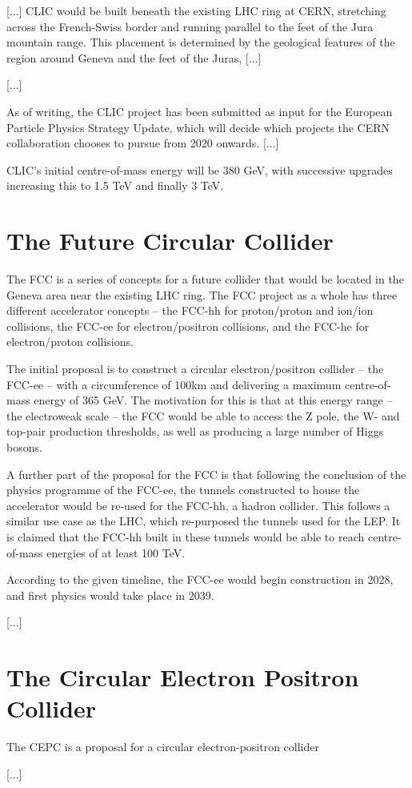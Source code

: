 [...] CLIC would be built beneath the existing LHC ring at CERN, stretching across the French-Swiss border and running parallel to the feet of the Jura mountain range. This placement is determined by the geological features of the region around Geneva and the feet of the Juras, [...]


[...]

As of writing, the CLIC project has been submitted as input for the European Particle Physics Strategy Update, which will decide which projects the CERN collaboration chooses to pursue from 2020  onwards. [...]

CLIC's initial centre-of-mass energy will be 380 GeV, with successive upgrades increasing this to 1.5 TeV and finally 3 TeV. 

\section{The Future Circular Collider}
The \acrfull{FCC} is a series of concepts for a future collider that would be located in the Geneva area near the existing LHC ring. The FCC project as a whole has three different accelerator concepts -- the FCC-hh for proton/proton and ion/ion collisions, the FCC-ee for electron/positron collisions, and the FCC-he for electron/proton collisions.

The initial proposal is to construct a circular electron/positron collider -- the FCC-ee -- with a circumference of 100km and delivering a maximum centre-of-mass energy of 365 GeV. The motivation for this is that at this energy range -- the electroweak scale -- the FCC would be able to access the Z pole, the W- and top-pair production thresholds, as well as producing a large number of Higgs bosons. 

A further part of the proposal for the FCC is that following the conclusion of the physics programme of the FCC-ee, the tunnels constructed to house the accelerator would be re-used for the FCC-hh, a hadron collider. This follows a similar use case as the LHC, which re-purposed the tunnels used for the \acrfull{LEP}. It is claimed that the FCC-hh built in these tunnels would be able to reach centre-of-mass energies of at least 100 TeV.

According to the given timeline, the FCC-ee would begin construction in 2028, and first physics would take place in 2039. 


[...]

\section{The Circular Electron Positron Collider}

The \acrfull{CEPC} is a proposal for a circular electron-positron collider 

[...]